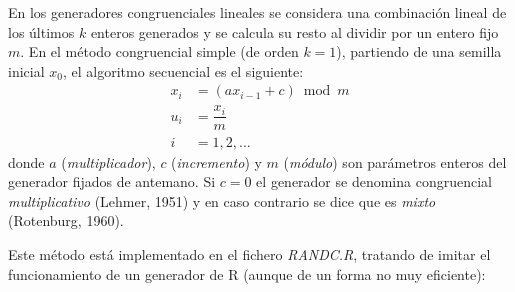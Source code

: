 \documentclass[
]{book}
\theoremstyle{break}
\theoremstyle{definition}
\theoremstyle{definition}
\theoremstyle{definition}
\theoremstyle{remark}
\begin{document}
En los generadores congruenciales lineales se considera una combinación lineal de los últimos \(k\) enteros generados y se calcula su resto al dividir por un entero fijo \(m\).
En el método congruencial simple (de orden \(k = 1\)), partiendo de una semilla inicial \(x_0\), el algoritmo secuencial es el siguiente:
\[\begin{aligned}
x_{i}  & = (ax_{i-1}+c) \bmod m \\
u_{i}  & = \dfrac{x_{i}}{m} \\
i  & =1,2,\ldots
\end{aligned}\]
donde \(a\) (\emph{multiplicador}), \(c\) (\emph{incremento}) y \(m\) (\emph{módulo}) son parámetros enteros del generador fijados de antemano. Si \(c=0\) el generador se denomina congruencial \emph{multiplicativo} (Lehmer, 1951) y en caso contrario se dice que es \emph{mixto} (Rotenburg, 1960).

Este método está implementado en el fichero \emph{RANDC.R}, tratando de imitar el funcionamiento de un generador de R (aunque de un forma no muy eficiente):
\end{document}
